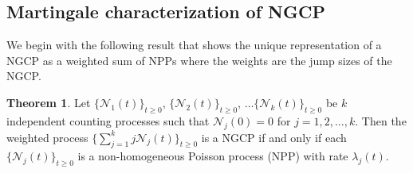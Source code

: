 \documentclass[11pt,oneside,reqno]{amsart}
\theoremstyle{definition}
\newtheorem{theorem}{\bf Theorem}[section]
\theoremstyle{remarkstyle}
\begin{document}
\subsection{Martingale characterization of NGCP}
We begin with the following result that shows the unique representation of a NGCP as a weighted sum of NPPs where the weights are the jump sizes of the NGCP. 
\begin{theorem}\label{ngcp_npp_equality}
    Let $\{\mathcal{N}_1(t)\}_{t\ge 0}$, $\{\mathcal{N}_2(t)\}_{t\ge 0}$, $\dots\{\mathcal{N}_k(t)\}_{t\ge 0}$ be $k$ independent counting processes such that $\mathcal{N}_j(0)=0$ for $j=1,2,\dots,k$. Then the weighted process $\{\sum_{j=1}^{k}j\mathcal{N}_j(t)\}_{t\ge 0}$ is a NGCP if and only if each $\{\mathcal{N}_j(t)\}_{t\ge 0}$ is a non-homogeneous Poisson process (NPP) with rate $\lambda_j(t)$.
\end{theorem}
\end{document}
